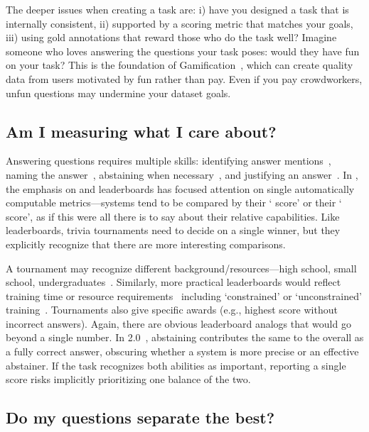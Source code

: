 The deeper issues when creating a  task are:
i) have you designed a task that is internally consistent,
ii) supported by a scoring metric that matches your goals,
iii) using gold annotations that reward those who do the task well?
Imagine someone who loves answering the questions your task poses: would they have fun on your task?
This is the foundation of Gamification~\citep{ahn-06}, which can create quality data from users motivated by fun rather than pay.
Even if you pay crowdworkers, unfun questions may undermine your dataset goals.

\subsection{Am I measuring what I care about?}
\label{subsection:measuring-what-you-care-about}



Answering questions requires multiple skills: identifying answer mentions~\citep{hermann-15}, 
naming the answer~\citep{yih-15}, abstaining when necessary~\citep{rajpurkar-18}, and justifying an answer~\citep{fever-18}.
In \qa{}, the emphasis on  and leaderboards has focused attention on single automatically computable
metrics---systems tend to be compared by their `\squad{} score' or their ` score', as if this were all there
is to say about their relative capabilities.  Like  leaderboards, trivia tournaments need to decide
on a single winner, but they explicitly recognize that there are more interesting comparisons.

A tournament may recognize different background/resources---high school, small school, undergraduates~\citep{naqt-eligibility}.  Similarly, more practical leaderboards would reflect training time
or resource requirements~\citep[see][]{dodge-19} including `constrained' or `unconstrained'
training~\citep{bojar-2014}.
Tournaments also give specific awards (e.g., highest score without incorrect
answers).  Again, there are obvious leaderboard analogs that would go beyond a single number.  
In \squad{} 2.0~\citep{rajpurkar-18}, abstaining contributes the same
to the overall \fone{} as a fully correct answer, obscuring whether a system
is more precise or an effective abstainer.  If the task
recognizes both abilities as important, reporting a single score risks implicitly prioritizing one balance of the two.

\subsection{Do my questions separate the best?}
\label{sec:discriminative}

